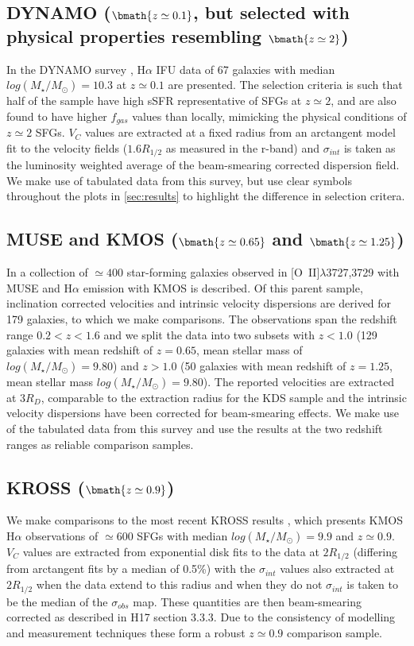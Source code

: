 \documentclass[fleqn,usenatbib]{mn2e}
\begin{document}
\subsection{DYNAMO ($\bmath{z\simeq0.1}$, but selected with physical properties resembling $\bmath{z\simeq2}$)}\label{subsec:DYNAMO}
In the DYNAMO survey \citep[G14]{Green2014}, H$\alpha$ IFU data of 67 galaxies with median $log(M_{\star}/M_{\odot})=10.3$ at $z\simeq0.1$ are presented.
The selection criteria is such that half of the sample have high sSFR representative of SFGs at $z\simeq2$, and are also found to have higher $f_{gas}$ values than locally, mimicking the physical conditions of $z\simeq2$ SFGs.
$V_{C}$ values are extracted at a fixed radius from an arctangent model fit to the velocity fields ($1.6R_{1/2}$ as measured in the r-band) and $\sigma_{int}$ is taken as the luminosity weighted average of the beam-smearing corrected dispersion field.
We make use of tabulated data from this survey, but use clear symbols throughout the plots in \cref{sec:results} to highlight the difference in selection critera.

\subsection{MUSE and KMOS ($\bmath{z\simeq0.65}$ and $\bmath{z\simeq1.25}$)}\label{subsec:MUSE_and_KMOS}
In \cite{Swinbank2017} a collection of $\simeq400$ star-forming galaxies observed in [O~{\sc II}]$\lambda$3727,3729 with MUSE and H$\alpha$ emission with KMOS is described.
Of this parent sample, inclination corrected velocities and intrinsic velocity dispersions are derived for 179 galaxies, to which we make comparisons.
The observations span the redshift range $0.2 < z < 1.6$ and we split the data into two subsets with $z < 1.0$ (129 galaxies with mean redshift of $z = 0.65$, mean stellar mass of $log(M_{\star}/M_{\odot})=9.80$) and $z > 1.0$ (50 galaxies with mean redshift of $z = 1.25$, mean stellar mass $log(M_{\star}/M_{\odot})=9.80$).
The reported velocities are extracted at $3R_{D}$, comparable to the extraction radius for the KDS sample and the intrinsic velocity dispersions have been corrected for beam-smearing effects.
We make use of the tabulated data from this survey and use the results at the two redshift ranges as reliable comparison samples.

\subsection{KROSS ($\bmath{z\simeq0.9}$)}\label{subsec:KROSS}
We make comparisons to the most recent KROSS results \citep[H17]{Harrison2017}, which presents KMOS H$\alpha$ observations of $\simeq600$ SFGs with median $log(M_{\star}/M_{\odot})=9.9$ and $z\simeq0.9$.
$V_{C}$ values are extracted from exponential disk fits to the data at $2R_{1/2}$ (differing from arctangent fits by a median of 0.5\%) with the $\sigma_{int}$ values also extracted at $2R_{1/2}$ when the data extend to this radius and when they do not $\sigma_{int}$ is taken to be the median of the $\sigma_{obs}$ map.
These quantities are then beam-smearing corrected as described in H17 section 3.3.3. 
Due to the consistency of modelling and measurement techniques these form a robust $z\simeq0.9$ comparison sample.
\end{document}
